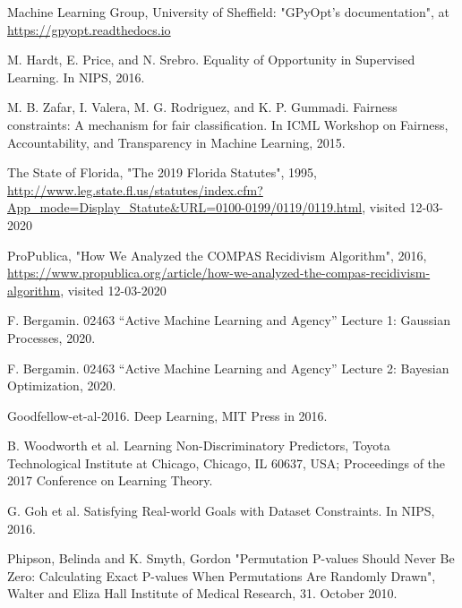 \documentclass[11pt, fleqn, titlepage]{article}
\begin{document}
	\begin{thebibliography}{9} \label{bibliography}
		
		 Machine Learning Group, University of Sheffield: "GPyOpt’s documentation", at \url{https://gpyopt.readthedocs.io}
		
		 M. Hardt, E. Price, and N. Srebro. Equality of Opportunity in Supervised Learning. In NIPS, 2016.
		
		 M. B. Zafar, I. Valera, M. G. Rodriguez, and K. P. Gummadi. Fairness constraints: A mechanism for fair classification.
		In ICML Workshop on Fairness, Accountability, and Transparency in Machine Learning, 2015.
		
		 The State of Florida, "The 2019 Florida Statutes", 1995,  \url{http://www.leg.state.fl.us/statutes/index.cfm?App_mode=Display_Statute&URL=0100-0199/0119/0119.html}, visited 12-03-2020
		
		 ProPublica, "How We Analyzed the COMPAS Recidivism Algorithm", 2016, \url{https://www.propublica.org/article/how-we-analyzed-the-compas-recidivism-algorithm}, visited 12-03-2020
		
		 F. Bergamin. 02463 “Active Machine Learning and Agency” Lecture 1: Gaussian Processes, 2020.
		
		 F. Bergamin. 02463 “Active Machine Learning and Agency” Lecture 2: Bayesian Optimization, 2020.
		
		 Goodfellow-et-al-2016. Deep Learning, MIT Press in 2016. 
		
		 B. Woodworth et al. Learning Non-Discriminatory Predictors, Toyota Technological Institute at Chicago, Chicago, IL 60637, USA; Proceedings of the 2017 Conference on Learning Theory.
		
		 G. Goh et al. Satisfying Real-world Goals with Dataset Constraints. In NIPS, 2016.
		
		 Phipson, Belinda and K. Smyth, Gordon "Permutation P-values Should Never Be Zero: Calculating Exact P-values When Permutations Are Randomly Drawn", Walter and Eliza Hall Institute of Medical Research, 31. October 2010.
		
	\end{thebibliography}
	
	\newpage
	
	
\end{document}
